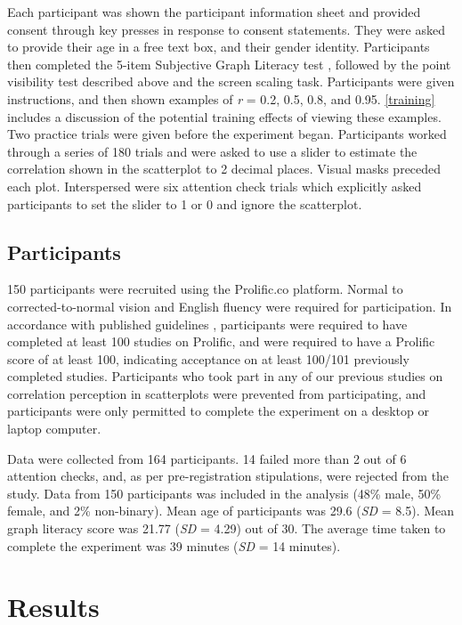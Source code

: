 \documentclass{vgtc}                          %
\begin{document}
Each participant was shown the participant information sheet and provided
consent through key presses in response to consent statements. They were asked
to provide their age in a free text box, and their gender identity. Participants
then completed the 5-item Subjective Graph Literacy test \cite{garcia_2016},
followed by the point visibility test described above and the screen scaling task.
Participants were given instructions, and then shown examples of \emph{r} = 0.2, 0.5, 0.8, and
0.95. \autoref{training} includes a discussion of the potential training effects of
viewing these examples. Two practice trials were given before the experiment began.
Participants worked through a series of 180 trials
and were asked to use a slider to estimate the correlation shown in
the scatterplot to 2 decimal places. Visual masks preceded each plot. Interspersed were six attention
check trials which explicitly asked participants to set the slider to 1 or 0 and ignore the scatterplot.

\hypertarget{participants}{%
\subsection{Participants}\label{participants}}

150 participants were recruited using the Prolific.co platform. Normal to
corrected-to-normal vision and English fluency were required for participation. In
accordance with published guidelines \cite{peer_2021},
participants were required to have completed at least 100 studies on Prolific, and were
required to have a Prolific score of at least 100, indicating acceptance on at least
100/101 previously completed studies. Participants who took part in any of our
previous studies on correlation perception in scatterplots
were prevented from participating, and participants were only
permitted to complete the experiment on a desktop or laptop computer.

Data were collected from 164 participants. 14 failed more than 2 out of 6 attention
checks, and, as per pre-registration stipulations, were rejected from the study. Data
from 150 participants was included in the analysis (48\%
male, 50\% female, and 2\%
non-binary). Mean age of participants was 29.6
(\emph{SD} = 8.5). Mean graph literacy score was 21.77
(\emph{SD} = 4.29) out of 30. The average time taken to complete
the experiment was 39 minutes (\emph{SD} = 14 minutes).

\hypertarget{results}{%
\section{Results}\label{results}}
\end{document}
